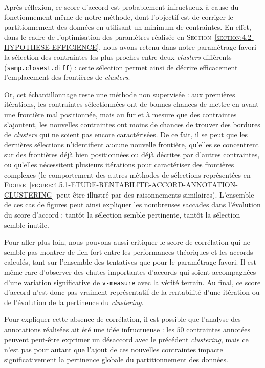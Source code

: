 			\begin{leftBarAuthorOpinion}
				Après réflexion, ce score d'accord est probablement infructueux à cause du fonctionnement même de notre méthode, dont l'objectif est de corriger le partitionnement des données en utilisant un minimum de contraintes.
				En effet, dans le cadre de l'optimisation des paramètres réalisée en \textsc{Section~\ref{section:4.2-HYPOTHESE-EFFICIENCE}}, nous avons retenu dans notre paramétrage favori la sélection des contraintes les plus proches entre deux \textit{clusters} différents (\texttt{samp.closest.diff}) : cette sélection permet ainsi de décrire efficacement l'emplacement des frontières de \textit{clusters}.
				
				Or, cet échantillonnage reste une méthode non supervisée : aux premières itérations, les contraintes sélectionnées ont de bonnes chances de mettre en avant une frontière mal positionnée, mais au fur et à mesure que des contraintes s'ajoutent, les nouvelles contraintes ont moins de chances de trouver des bordures de \textit{clusters} qui ne soient pas encore caractérisées.
				De ce fait, il se peut que les dernières sélections n'identifient aucune nouvelle frontière, qu'elles se concentrent sur des frontières déjà bien positionnées ou déjà décrites par d'autres contraintes, ou qu'elles nécessitent plusieurs itérations pour caractériser des frontières complexes (le comportement des autres méthodes de sélections représentées en \textsc{Figure~\ref{figure:4.5.1-ETUDE-RENTABILITE-ACCORD-ANNOTATION-CLUSTERING}} peut être illustré par des raisonnements similaires).
				L'ensemble de ces cas de figures peut ainsi expliquer les nombreuses saccades dans l'évolution du score d'accord : tantôt la sélection semble pertinente, tantôt la sélection semble inutile.
			\end{leftBarAuthorOpinion}
			
			Pour aller plus loin, nous pouvons aussi critiquer le score de corrélation qui ne semble pas montrer de lien fort entre les performances théoriques et les accords calculés, tant sur l'ensemble des tentatives que pour le paramétrage favori.
			Il est même rare d'observer des chutes importantes d'accords qui soient accompagnées d'une variation significative de \texttt{v-measure} avec la vérité terrain.
			Au final, ce score d'accord n'est donc pas vraiment représentatif de la rentabilité d'une itération ou de l'évolution de la pertinence du \textit{clustering}.
			\begin{leftBarAuthorOpinion}
				Pour expliquer cette absence de corrélation, il est possible que l'analyse des annotations réalisées ait été une idée infructueuse : les $50$ contraintes annotées peuvent peut-être exprimer un désaccord avec le précédent \textit{clustering}, mais ce n'est pas pour autant que l'ajout de ces nouvelles contraintes impacte significativement la pertinence globale du partitionnement des données.
			\end{leftBarAuthorOpinion}
			
